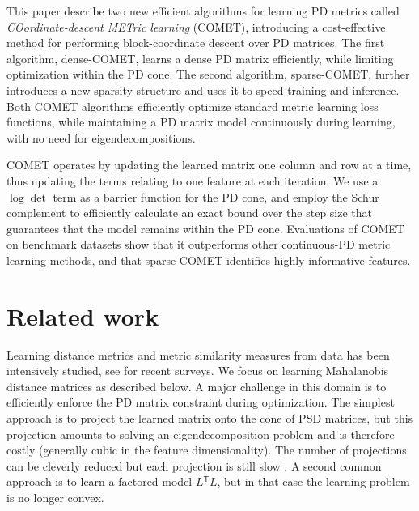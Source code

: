 \documentclass[twoside,11pt]{article}
\newcommand\mat[1]{{#1}}
\newcommand{\T}{{}^\mathsf{T}}
\newcommand{\cholL}{\mat{L}}
\begin{document}
This paper describe two new efficient algorithms for learning PD metrics called {\em{COordinate-descent METric learning}} (COMET), introducing a cost-effective method for performing block-coordinate descent over PD  matrices. The first algorithm, dense-COMET, learns a dense PD matrix efficiently, while limiting optimization within the PD cone. The second algorithm, sparse-COMET, further introduces a new sparsity structure and uses it to speed training and inference. Both COMET algorithms  efficiently optimize standard metric learning loss functions, while maintaining a PD matrix model continuously during learning, with no need for eigendecompositions. 

COMET operates by updating the learned matrix one column and row at a time, thus updating the terms relating to one feature at each iteration. We use a $\log \det$ term as a barrier function for the PD cone, and employ the Schur complement to efficiently calculate an exact bound over the step size that guarantees that the model remains within the PD cone. Evaluations of COMET on benchmark datasets show that it outperforms other continuous-PD metric learning methods, and that sparse-COMET identifies highly informative features. 

\vspace{-6pt}
\section{Related work}
\vskip -5pt
Learning distance metrics and metric similarity measures from data has been intensively studied, see \citet{bellet2013survey, kulis2012survey} for recent surveys. We focus on learning Mahalanobis distance matrices as described below. A major challenge in this domain is to efficiently enforce the PD matrix constraint during optimization. The simplest approach is to project the learned matrix onto the cone of PSD matrices, but this projection amounts to solving an eigendecomposition problem and is therefore costly (generally cubic in the feature dimensionality). The number of projections can be cleverly reduced but each projection is still slow \citep{qianHD, qian}. A second common approach is to learn a factored model $\cholL\T \cholL$, but in that case the learning problem is no longer convex. 
\end{document}
